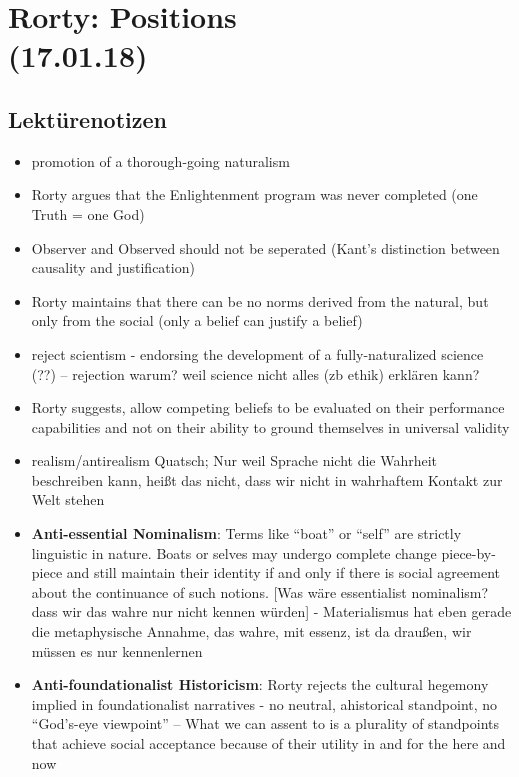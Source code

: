 \documentclass[emulatestandardclasses]{scrartcl}
\begin{document}
\section{Rorty: Positions\\(17.01.18)}

\subsection{Lektürenotizen}

\begin{itemize}
  \item promotion of a thorough-going naturalism
  \item Rorty argues that the Enlightenment program was never completed (one Truth = one God)
  \item Observer and Observed should not be seperated (Kant’s distinction between causality and justification)
  \item Rorty maintains that there can be no norms derived from the natural, but only from the social (only a belief can justify a belief)
  \item reject scientism - endorsing the development of a fully-naturalized science (??) -- rejection warum? weil science nicht alles (zb ethik) erklären kann?
  \item Rorty suggests, allow competing beliefs to be evaluated on their performance capabilities and not on their ability to ground themselves in universal validity
  \item realism/antirealism Quatsch; Nur weil Sprache nicht die Wahrheit beschreiben kann, heißt das nicht, dass wir nicht in wahrhaftem Kontakt zur Welt stehen
  \item \textbf{Anti-essential Nominalism}: Terms like “boat” or “self” are strictly linguistic in nature. Boats or selves may undergo complete change piece-by-piece and still maintain their identity if and only if there is social agreement about the continuance of such notions. [Was wäre essentialist nominalism? dass wir das wahre nur nicht kennen würden] - Materialismus hat eben gerade die metaphysische Annahme, das wahre, mit essenz, ist da draußen, wir müssen es nur kennenlernen
  \item \textbf{Anti-foundationalist Historicism}: Rorty rejects the cultural hegemony implied in foundationalist narratives - no neutral, ahistorical standpoint, no “God’s-eye viewpoint” -- What we can assent to is a plurality of standpoints that achieve social acceptance because of their utility in and for the here and now

\end{itemize}
\end{document}
